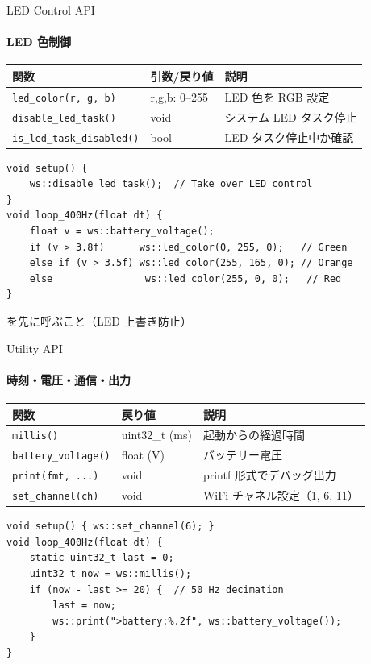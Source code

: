\documentclass[aspectratio=169, 14pt]{beamer}
\begin{document}
\begin{frame}[fragile]{LED Control API}
  \framesubtitle{LED 色制御}
  {\small
  \begin{tabular}{lll}
    \hline
    \textbf{関数} & \textbf{引数/戻り値} & \textbf{説明} \\
    \hline
    \texttt{led\_color(r, g, b)}      & r,g,b: 0--255 & LED 色を RGB 設定 \\
    \texttt{disable\_led\_task()}     & void           & システム LED タスク停止 \\
    \texttt{is\_led\_task\_disabled()} & bool          & LED タスク停止中か確認 \\
    \hline
  \end{tabular}
  }

  \vspace{0.3em}

  \begin{lstlisting}[style=sfcpp, basicstyle=\ttfamily\scriptsize]
void setup() {
    ws::disable_led_task();  // Take over LED control
}
void loop_400Hz(float dt) {
    float v = ws::battery_voltage();
    if (v > 3.8f)      ws::led_color(0, 255, 0);   // Green
    else if (v > 3.5f) ws::led_color(255, 165, 0); // Orange
    else                ws::led_color(255, 0, 0);   // Red
}
  \end{lstlisting}

  \vspace{0.2em}
  {\footnotesize {}  を先に呼ぶこと（LED 上書き防止）}
\end{frame}

\begin{frame}[fragile]{Utility API}
  \framesubtitle{時刻・電圧・通信・出力}
  {\small
  \begin{tabular}{lll}
    \hline
    \textbf{関数} & \textbf{戻り値} & \textbf{説明} \\
    \hline
    \texttt{millis()}           & uint32\_t (ms) & 起動からの経過時間 \\
    \texttt{battery\_voltage()} & float (V)      & バッテリー電圧 \\
    \texttt{print(fmt, ...)}    & void           & printf 形式でデバッグ出力 \\
    \texttt{set\_channel(ch)}   & void           & WiFi チャネル設定（1, 6, 11） \\
    \hline
  \end{tabular}
  }

  \vspace{0.3em}

  \begin{lstlisting}[style=sfcpp, basicstyle=\ttfamily\scriptsize]
void setup() { ws::set_channel(6); }
void loop_400Hz(float dt) {
    static uint32_t last = 0;
    uint32_t now = ws::millis();
    if (now - last >= 20) {  // 50 Hz decimation
        last = now;
        ws::print(">battery:%.2f", ws::battery_voltage());
    }
}
  \end{lstlisting}
\end{frame}
\end{document}
